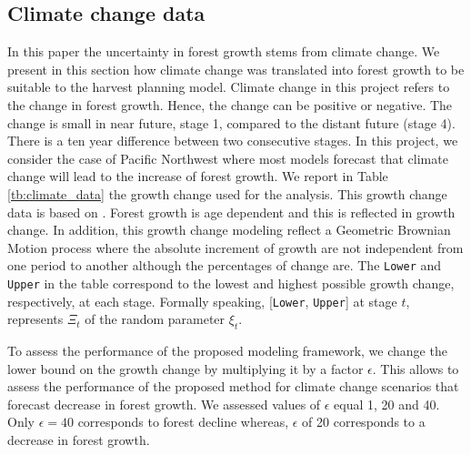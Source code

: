 \documentclass[forests,article,submit,moreauthors,pdftex]{Definitions/mdpi}
\begin{document}
\subsection{Climate change data}

In this paper the uncertainty in forest growth stems from climate change. We present in this section how climate change was translated into forest growth to be suitable to the harvest planning model.
Climate change in this project refers to the change in forest growth. Hence, the change can be positive or negative. The change is small in near future, stage 1, compared to the distant future (stage 4). There is a ten year difference between two consecutive stages. 
In this project, we consider the case of Pacific Northwest where most models forecast that climate change will lead to the increase of forest growth. We report in Table \ref{tb:climate_data} the growth change used for the analysis. This growth change data is based on \cite[Table 3]{Latta2010}. Forest growth is age dependent and this is reflected in growth change. In addition, this growth change  modeling reflect a Geometric Brownian Motion process where the absolute increment of growth are not independent from one period to another although the percentages of change are.
The \texttt{Lower} and \texttt{Upper} in the table correspond to the lowest and highest possible growth change, respectively, at each stage. 
Formally speaking, [\texttt{Lower}, \texttt{Upper}] at stage $t$, represents $\Xi_t$ of the random parameter $\xi_t$.

To assess the performance of the proposed modeling framework, we change the lower bound on the growth change by multiplying it by a factor $\epsilon$. This allows to assess the performance of the proposed method for climate change scenarios that forecast decrease in forest growth. We assessed values of $\epsilon$ equal 1, 20 and 40. Only $\epsilon = 40$ corresponds to forest decline whereas, $\epsilon$ of  20 corresponds to a decrease in forest growth.
\end{document}
